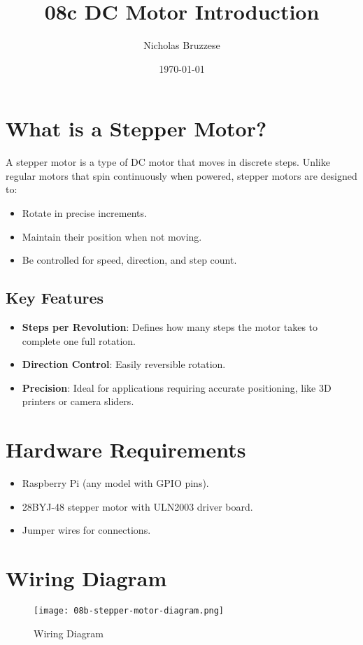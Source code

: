 \documentclass{article}
\title{08c DC Motor Introduction}
\author{Nicholas Bruzzese}
\date{\today}
\begin{document}
	
	\maketitle
	
	\section*{What is a Stepper Motor?}
	A stepper motor is a type of DC motor that moves in discrete steps. Unlike regular motors that spin continuously when powered, stepper motors are designed to:
	\begin{itemize}
		\item Rotate in precise increments.
		\item Maintain their position when not moving.
		\item Be controlled for speed, direction, and step count.
	\end{itemize}
	
	\subsection*{Key Features}
	\begin{itemize}
		\item \textbf{Steps per Revolution}: Defines how many steps the motor takes to complete one full rotation.
		\item \textbf{Direction Control}: Easily reversible rotation.
		\item \textbf{Precision}: Ideal for applications requiring accurate positioning, like 3D printers or camera sliders.
	\end{itemize}
	
	\section*{Hardware Requirements}
	\begin{itemize}
		\item Raspberry Pi (any model with GPIO pins).
		\item 28BYJ-48 stepper motor with ULN2003 driver board.
		\item Jumper wires for connections.
	\end{itemize}
	
	\section*{Wiring Diagram}
	\begin{figure}[H]
		\centering
		\texttt{[image: 08b-stepper-motor-diagram.png]} %
		\caption{Wiring Diagram}
	\end{figure}
	
\end{document}
